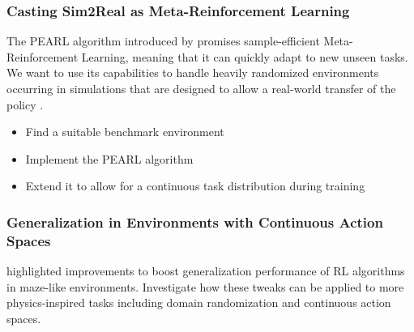 \documentclass[a4paper]{article}
\begin{document}
\subsubsection{Casting Sim2Real as Meta-Reinforcement Learning}
The PEARL algorithm introduced by \cite{rakelly2019} promises sample-efficient Meta-Reinforcement Learning, meaning that it can quickly adapt to new unseen tasks. We want to use its capabilities to handle heavily randomized environments occurring in simulations that are designed to allow a real-world transfer of the policy \cite{sievers2021}.
\begin{itemize}
	\item Find a suitable benchmark environment
	\item Implement the PEARL algorithm
	\item Extend it to allow for a continuous task distribution during training
\end{itemize}



\subsubsection{Generalization in Environments with Continuous Action Spaces}
\cite{igl2019} highlighted improvements to boost generalization performance of RL algorithms in maze-like environments. Investigate how these tweaks can be applied to more physics-inspired tasks including domain randomization and continuous action spaces.




\end{document}
